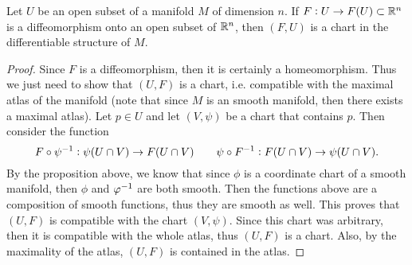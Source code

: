 \begin{proposition}
	Let $ U $ be an open subset of a manifold $ M $ of dimension $ n $. If $ F: U \to F(U) \subset \mathbb{R}^n $ is a diffeomorphism onto an open subset of $ \mathbb{R}^n $, then $ (F,U) $ is a chart in the differentiable structure of $ M $.
\end{proposition}
\begin{proof}
	Since $ F $ is a diffeomorphism, then it is certainly a homeomorphism. 
	Thus we just need to show that $ (U,F) $ is a chart, i.e. compatible with the maximal atlas of the manifold (note that since $ M $ is an smooth manifold, then there exists a maximal atlas). Let $ p \in  U $ and let $ (V,\psi) $ be a chart that contains $ p $. Then consider the function
	\[ F \circ \psi^{-1}: \psi(U\cap V) \to F(U\cap V) \qquad \psi\circ F^{-1}: F(U\cap V) \to \psi(U\cap V). \]
	By the proposition above, we know that since $ \phi $ is a coordinate chart of a smooth manifold, then $ \phi $ and $ \varphi^{-1} $ are both smooth. Then the functions above are a composition of smooth functions, thus they are smooth as well. This proves that $ (U,F) $ is compatible with the chart $ (V,\psi) $. Since this chart was arbitrary, then it is compatible with the whole atlas, thus $ (U,F) $ is a chart. Also, by the maximality of the atlas, $  (U,F) $ is contained in the atlas.
\end{proof}



\newpage

